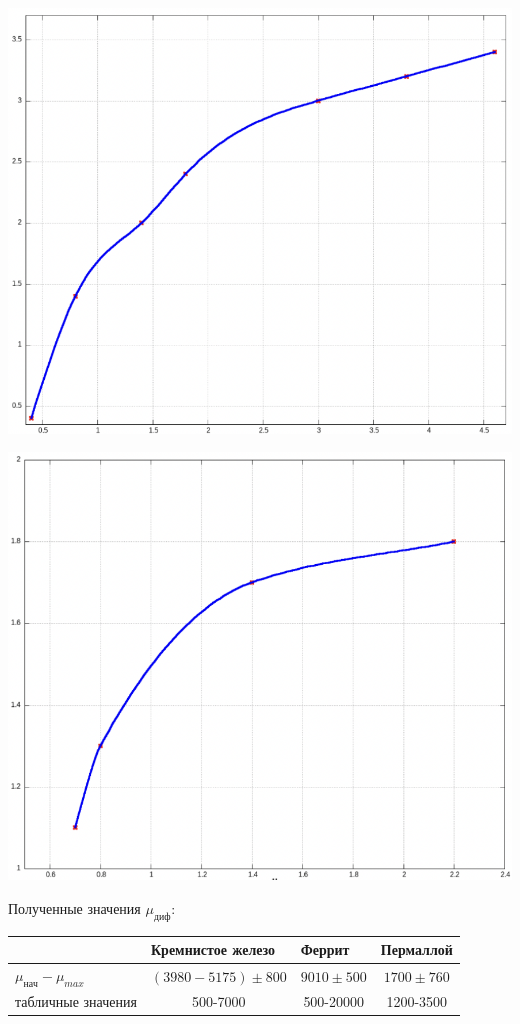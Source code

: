 \documentclass[11pt]{article}
\begin{document}
\begin{enumerate}
\begin{center}
\includegraphics[scale=1]{graf2.png}
\end{center}

\begin{center}
\includegraphics[scale=1]{graf3.png}
\end{center}

Полученные значения $\mu_{диф}$:
\begin{table}[h]
\centering
\begin{tabular}{|l|c|c|c|}
\hline
                      & \multicolumn{1}{l|}{Кремнистое железо} & \multicolumn{1}{l|}{Феррит} & \multicolumn{1}{l|}{Пермаллой} \\ \hline
$\mu_{нач} - \mu_{max}$ &     $(3980 - 5175)\pm 800$                                   & $       9010\pm 500$                     &$              1700\pm 760                 $ \\ \hline
табличные значения    & 500-7000                               & 500-20000                   & 1200-3500                      \\ \hline
\end{tabular}
\end{table}



\end{enumerate}
\end{document}
